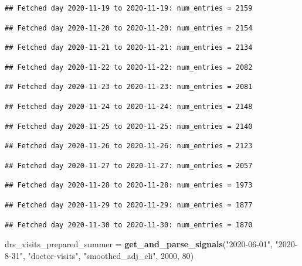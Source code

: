 \documentclass[]{article}
\newenvironment{Shaded}{\begin{snugshade}}{\end{snugshade}}
\newcommand{\DecValTok}[1]{\textcolor[rgb]{0.00,0.00,0.81}{#1}}
\newcommand{\KeywordTok}[1]{\textcolor[rgb]{0.13,0.29,0.53}{\textbf{#1}}}
\newcommand{\NormalTok}[1]{#1}
\newcommand{\StringTok}[1]{\textcolor[rgb]{0.31,0.60,0.02}{#1}}
\begin{document}
\begin{verbatim}
## Fetched day 2020-11-19 to 2020-11-19: num_entries = 2159
\end{verbatim}

\begin{verbatim}
## Fetched day 2020-11-20 to 2020-11-20: num_entries = 2154
\end{verbatim}

\begin{verbatim}
## Fetched day 2020-11-21 to 2020-11-21: num_entries = 2134
\end{verbatim}

\begin{verbatim}
## Fetched day 2020-11-22 to 2020-11-22: num_entries = 2082
\end{verbatim}

\begin{verbatim}
## Fetched day 2020-11-23 to 2020-11-23: num_entries = 2081
\end{verbatim}

\begin{verbatim}
## Fetched day 2020-11-24 to 2020-11-24: num_entries = 2148
\end{verbatim}

\begin{verbatim}
## Fetched day 2020-11-25 to 2020-11-25: num_entries = 2140
\end{verbatim}

\begin{verbatim}
## Fetched day 2020-11-26 to 2020-11-26: num_entries = 2123
\end{verbatim}

\begin{verbatim}
## Fetched day 2020-11-27 to 2020-11-27: num_entries = 2057
\end{verbatim}

\begin{verbatim}
## Fetched day 2020-11-28 to 2020-11-28: num_entries = 1973
\end{verbatim}

\begin{verbatim}
## Fetched day 2020-11-29 to 2020-11-29: num_entries = 1877
\end{verbatim}

\begin{verbatim}
## Fetched day 2020-11-30 to 2020-11-30: num_entries = 1870
\end{verbatim}

\begin{Shaded}
\begin{Highlighting}[]
\NormalTok{drs_visits_prepared_summer =}\StringTok{ }\KeywordTok{get_and_parse_signals}\NormalTok{(}\StringTok{"2020-06-01"}\NormalTok{, }\StringTok{"2020-8-31"}\NormalTok{, }\StringTok{"doctor-visits"}\NormalTok{, }\StringTok{"smoothed_adj_cli"}\NormalTok{, }\DecValTok{2000}\NormalTok{, }\DecValTok{80}\NormalTok{)}
\end{Highlighting}
\end{Shaded}
\end{document}
